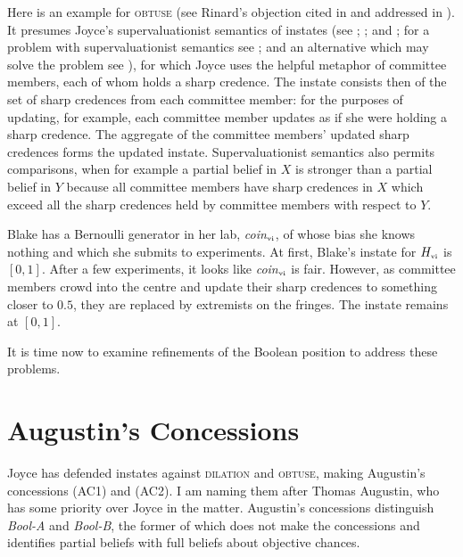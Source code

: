 \documentclass[11pt]{article}
\newcommand{\anderson}[0]{\textit{Bool-A}}
\newcommand{\augustin}[0]{\textit{Bool-B}}
\begin{document}
Here is an example for \textsc{obtuse} (see Rinard's objection cited
in  and addressed in ).
It presumes Joyce's supervaluationist semantics of instates (see
; ; and
; for a problem with supervaluationist semantics
see ; and an alternative which may solve the
problem see ), for which Joyce uses the
helpful metaphor of committee members, each of whom holds a sharp
credence. The instate consists then of the set of sharp credences from
each committee member: for the purposes of updating, for example, each
committee member updates as if she were holding a sharp credence. The
aggregate of the committee members' updated sharp credences forms the
updated instate. Supervaluationist semantics also permits comparisons,
when for example a partial belief in $X$ is stronger than a partial
belief in $Y$ because all committee members have sharp credences in
$X$ which exceed all the sharp credences held by committee members
with respect to $Y$.

\begin{quotex}
  \label{ex:learning} Blake has a Bernoulli
  generator in her lab, \textit{coin}$_{\mbox{\tiny{vi}}}$, of whose
  bias she knows nothing and which she submits to experiments. At first,
  Blake's instate for $H_{\mbox{\tiny{vi}}}$ is $[0,1]$. After a few
  experiments, it looks like \textit{coin}$_{\mbox{\tiny{vi}}}$ is
  fair. However, as committee members crowd into the centre and update
  their sharp credences to something closer to $0.5$, they are
  replaced by extremists on the fringes. The instate remains at
  $[0,1]$. 
\end{quotex}

It is time now to examine refinements of the Boolean position to
address these problems.

\section{Augustin's Concessions}
\label{AugustinsConcessions}

Joyce has defended instates against \textsc{dilation} and
\textsc{obtuse}, making Augustin's concessions (AC1) and (AC2). I am
naming them after Thomas Augustin, who has some priority over Joyce in
the matter. Augustin's concessions distinguish {\anderson} and
{\augustin}, the former of which does not make the concessions and
identifies partial beliefs with full beliefs about objective chances.
\end{document}
